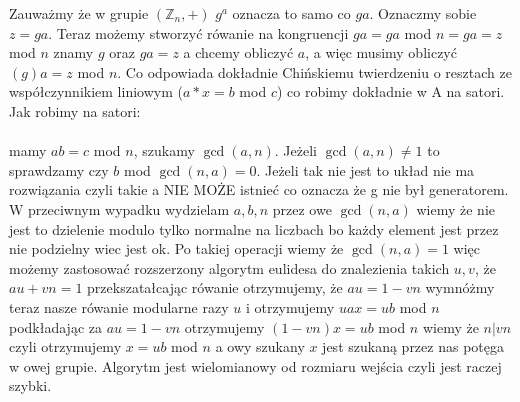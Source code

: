  
 Zauważmy że w grupie $(\mathbb{Z}_{n},+)$ $g^{a}$ oznacza to samo co $ga$. Oznaczmy sobie $z = ga$. Teraz możemy stworzyć rówanie na kongruencji $ga = ga$ mod $n = ga = z$ mod $n$ znamy $g$ oraz $ga = z$ a chcemy obliczyć $a$, a więc musimy obliczyć $(g)a = z$ mod $n$. Co odpowiada dokładnie Chińskiemu twierdzeniu o resztach ze współczynnikiem liniowym ($a * x = b$ mod $c$) co robimy dokładnie w A na satori. Jak robimy na satori:\\ \\
 mamy $ab = c$ mod $n$, szukamy $\gcd(a,n)$. Jeżeli $\gcd(a,n) \neq 1$ to sprawdzamy czy $b$ mod $\gcd(n,a) = 0$. Jeżeli tak nie jest to układ nie ma rozwiązania czyli takie a NIE MOŻE istnieć co oznacza że g nie był generatorem. W przeciwnym wypadku wydzielam $a,b,n$ przez owe $\gcd(n,a)$ wiemy że nie jest to dzielenie modulo tylko normalne na liczbach bo każdy element jest przez nie podzielny wiec jest ok. Po takiej operacji wiemy że $\gcd(n,a) = 1$ więc możemy zastosować rozszerzony algorytm eulidesa do znalezienia takich $u,v$, że $au + vn = 1$ przekszatałcając rówanie otrzymujemy, że $au = 1 - vn$ wymnóżmy teraz nasze rówanie modularne razy $u$ i otrzymujemy $uax = ub$ mod $n$ podkładając za $au = 1 - vn$ otrzymujemy $(1 - vn)x = ub$ mod $n$ wiemy że $n | vn$ czyli otrzymujemy $x = ub$ mod $n$ a owy szukany $x$ jest szukaną przez nas potęga w owej grupie. Algorytm jest wielomianowy od rozmiaru wejścia czyli jest raczej szybki.



